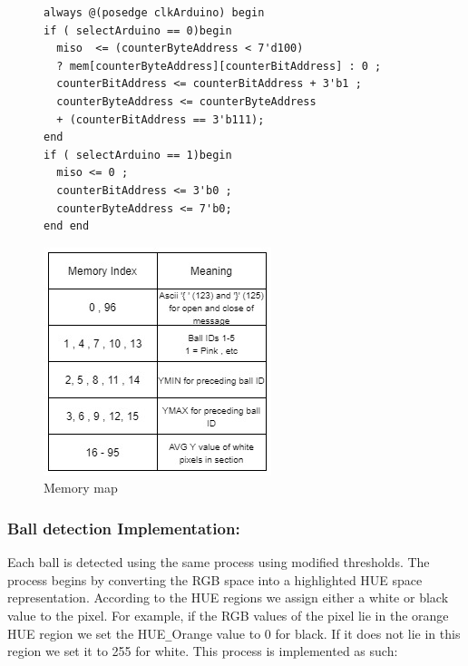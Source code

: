 \documentclass[10pt,twoside]{article}
\begin{document}
\begin{figure}[hbt]
\begin{minipage}{.56\textwidth}
\begin{verbatim}
always @(posedge clkArduino) begin
if ( selectArduino == 0)begin
  miso  <= (counterByteAddress < 7'd100) 
  ? mem[counterByteAddress][counterBitAddress] : 0 ;
  counterBitAddress <= counterBitAddress + 3'b1 ;
  counterByteAddress <= counterByteAddress 
  + (counterBitAddress == 3'b111);
end    
if ( selectArduino == 1)begin
  miso <= 0 ;
  counterBitAddress <= 3'b0 ;
  counterByteAddress <= 7'b0;
end end
\end{verbatim}
\end{minipage}
\begin{minipage}{.43\textwidth}
        \includegraphics[scale = 0.4]{memoryMap.jpg}
            \centering
            \caption{Memory map}
            \label{fig:InitalDesign}
\end{minipage}
\end{figure}


\newpage

\subsubsection{Ball detection Implementation:}

Each ball is detected using the same process using modified thresholds. The process begins by converting the RGB space into a highlighted HUE space representation. According to the HUE regions we assign either a white or black value to the pixel. For example, if the RGB values of the pixel lie in the orange HUE region we set the HUE\verb|_|Orange value to 0 for black. If it does not lie in this region we set it to 255 for white. This process is implemented as such:
\end{document}
